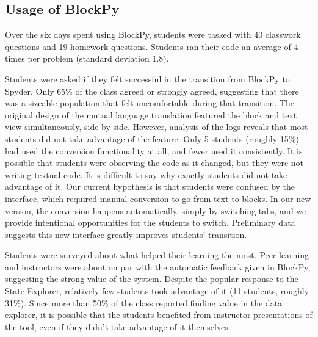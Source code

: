\documentclass[10pt, conference, compsocconf]{IEEEtran}
\begin{document}
\subsection{Usage of BlockPy}

Over the six days spent using BlockPy, students were tasked with 40 classwork questions and 19 homework questions.
Students ran their code an average of 4 times per problem (standard deviation 1.8).

Students were asked if they felt successful in the transition from BlockPy to Spyder.
Only 65\% of the class agreed or strongly agreed, suggesting that there was a sizeable population that felt uncomfortable during that transition.
The original design of the mutual language translation featured the block and text view simultaneously, side-by-side.
However, analysis of the logs reveals that most students did not take advantage of the feature.
Only 5 students (roughly 15\%) had used the conversion functionality at all, and fewer used it consistently.
It is possible that students were observing the code as it changed, but they were not writing textual code.
It is difficult to say why exactly students did not take advantage of it.
Our current hypothesis is that students were confused by the interface, which required manual conversion to go from text to blocks.
In our new version, the conversion happens automatically, simply by switching tabs, and we provide intentional opportunities for the students to switch.
Preliminary data suggests this new interface greatly improves students' transition.


Students were surveyed about what helped their learning the most.
Peer learning and instructors were about on par with the automatic feedback given in BlockPy, suggesting the strong value of the system.
Despite the popular response to the State Explorer, relatively few students took advantage of it (11 students, roughly 31\%).
Since more than 50\% of the class reported finding value in the data explorer, it is possible that the students benefited from instructor presentations of the tool, even if they didn't take advantage of it themselves. 

\end{document}
